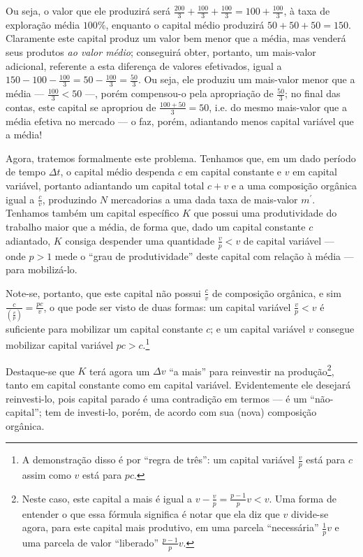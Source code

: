\documentclass[12pt]{article}
\numberwithin{equation}{section}
\theoremstyle{plain}
\theoremstyle{definition}
\theoremstyle{remark}
\begin{document}
Ou seja, o valor que ele produzirá será $\frac{200}{3} + \frac{100}{3} + \frac{100}{3}=100+\frac{100}{3}$, à taxa de exploração média $100\%$, enquanto o capital médio produzirá $50+50+50=150$. Claramente este capital produz um valor bem menor que a média, mas venderá seus produtos \textit{ao valor médio}; conseguirá obter, portanto, um mais-valor adicional, referente a esta diferença de valores efetivados, igual a $150-100 - \frac{100}{3}=50-\frac{100}{3}=\frac{50}{3}$. Ou seja, ele produziu um mais-valor menor que a média — $\frac{100}{3}<50$ —, porém compensou-o pela apropriação de $\frac{50}{3}$; no final das contas, este capital se apropriou de $\frac{100+50}{3} = 50$, i.e. do mesmo mais-valor que a média efetiva no mercado — o faz, porém, adiantando menos capital variável que a média!

Agora, tratemos formalmente este problema. Tenhamos que, em um dado período de tempo $\Delta t$, o capital médio despenda $c$ em capital constante e $v$ em capital variável, portanto adiantando um capital total $c+v$ e a uma composição orgânica igual a $\frac{c}{v}$, produzindo $N$ mercadorias a uma dada taxa de mais-valor $m^{\prime}$. Tenhamos também um capital específico $K$ que possui uma produtividade do trabalho maior que a média, de forma que, dado um capital constante $c$ adiantado, $K$ consiga despender uma quantidade $\frac{v}{p}<v$ de capital variável — onde $p>1$ mede o ``grau de produtividade'' deste capital com relação à média — para mobilizá-lo.

Note-se, portanto, que este capital não possui $\frac{c}{v}$ de composição orgânica, e sim $\frac{c}{\left( \frac{v}{p} \right)} = \frac{pc}{v}$, o que pode ser visto de duas formas: um capital variável $\frac{v}{p}<v$ é suficiente para mobilizar um capital constante $c$; e um capital variável $v$ consegue mobilizar capital variável $pc>c$.\footnote{A demonstração disso é por ``regra de três'': um capital variável $\frac{v}{p}$ está para $c$ assim como $v$ está para $pc$.}

Destaque-se que $K$ terá agora um $\Delta v$ ``a mais'' para reinvestir na produção\footnote{Neste caso, este capital a mais é igual a $v-\frac{v}{p} = \frac{p-1}{p}v < v$. Uma forma de entender o que essa fórmula significa é notar que ela diz que $v$ divide-se agora, para este capital mais produtivo, em uma parcela ``necessária'' $\frac{1}{p}v$ e uma parcela de valor ``liberado'' $\frac{p-1}{p}v$. }, tanto em capital constante como em capital variável. Evidentemente ele desejará reinvesti-lo, pois capital parado é uma contradição em termos — é um ``não-capital''; tem de investi-lo, porém, de acordo com sua (nova) composição orgânica. 
\end{document}
